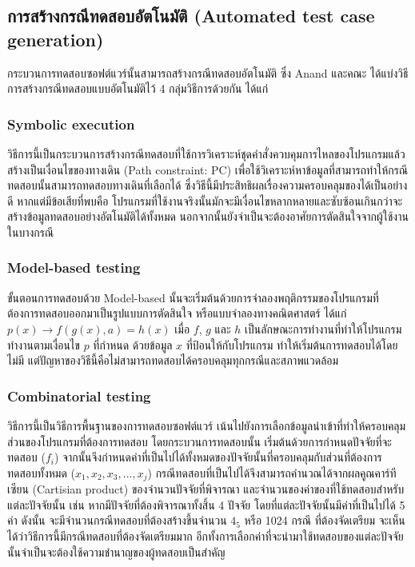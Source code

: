 \subsection{การสร้างกรณีทดสอบอัตโนมัติ (Automated test case generation)}

กระบวนการทดสอบซอฟต์แวร์นั้นสามารถสร้างกรณีทดสอบอัตโนมัติ ซึ่ง Anand และคณะ \cite{Anand2013} ได้แบ่งวิธีการสร้างกรณีทดสอบแบบอัตโนมัติไว้
4 กลุ่มวิธีการด้วยกัน ได้แก่ 

\subsubsection{Symbolic execution}

วิธีการนี้เป็นกระบวนการสร้างกรณีทดสอบที่ใช้การวิเคราะห์ชุดคำสั่งควบคุมการไหลของโปรแกรมแล้วสร้างเป็นเงื่อนไขของทางเดิน (Path constraint: PC) 
เพื่อใช้วิเคราะห์หาข้อมูลที่สามารถทำให้กรณีทดสอบนั้นสามารถทดสอบทางเดินที่เลือกได้ ซึ่งวิธีนี้มีประสิทธิผลเรื่องความครอบคลุมของ{\sourcecode}ได้เป็นอย่างดี
หากแต่มีข้อเสียที่พบคือ โปรแกรมที่ใช้งานจริงนั้นมักจะมีเงื่อนไขหลากหลายและซับซ้อนเกินกว่าจะสร้างข้อมูลทดสอบอย่างอัตโนมัติได้ทั้งหมด 
นอกจากนั้นยังจำเป็นจะต้องอาศัยการตัดสินใจจากผู้ใช้งานในบางกรณี


\subsubsection{Model-based testing}

ขั้นตอนการทดสอบด้วย Model-based นั้นจะเริ่มต้นด้วยการจำลองพฤติกรรมของโปรแกรมที่ต้องการทดสอบออกมาเป็นรูปแบบการตัดสินใจ หรือแบบจำลองทางคณิตศาสตร์
ได้แก่ $p(x) \rightarrow f(g(x), a) = h(x)$ เมื่อ $f$, $g$ และ $h$ เป็นลักษณะการทำงานที่ทำให้โปรแกรมทำงานตามเงื่อนไข $p$ ที่กำหนด 
ด้วยข้อมูล $x$ ที่ป้อนให้กับโปรแกรม ทำให้เริ่มต้นการทดสอบได้โดยไม่มี{\sourcecode} แต่ปัญหาของวิธีนี้คือไม่สามารถทดสอบได้ครอบคลุมทุกกรณีและสภาพแวดล้อม

\subsubsection{Combinatorial testing}

วิธีการนี้เป็นวิธีการพื้นฐานของการทดสอบซอฟต์แวร์ เน้นไปยังการเลือกข้อมูลนำเข้าที่ทำให้ครอบคลุมส่วนของโปรแกรมที่ต้องการทดสอบ โดยกระบวนการทดสอบนั้น
เริ่มต้นด้วยการกำหนดปัจจัยที่จะทดสอบ ($f_i$) จากนั้นจึงกำหนดค่าที่เป็นไปได้ทั้งหมดของปัจจัยนั้นที่ครอบคลุมกับส่วนที่ต้องการทดสอบทั้งหมด 
(${x_1, x_2, x_3, ..., x_j}$) กรณีทดสอบที่เป็นไปได้จึงสามารถคำนวณได้จากผลคูณคาร์ทีเซียน (Cartisian product) ของจำนวนปัจจัยที่พิจารณา 
และจำนวนของค่าของที่ใช้ทดสอบสำหรับแต่ละปัจจัยนั้น เช่น หากมีปัจจัยที่ต้องพิจารณาทั้งสิ้น 4 ปัจจัย โดยที่แต่ละปัจจัยนั้นมีค่าที่เป็นไปได้ 5 ค่า ดังนั้น 
จะมีจำนวนกรณีทดสอบที่ต้องสร้างขึ้นจำนวน $4_5$ หรือ 1024 กรณี ที่ต้องจัดเตรียม จะเห็นได้ว่าวิธีการนี้มีกรณีทดสอบที่ต้องจัดเตรียมมาก 
อีกทั้งการเลือกค่าที่จะนำมาใช้ทดสอบของแต่ละปัจจัยนั้นจำเป็นจะต้องใช้ความชำนาญของผู้ทดสอบเป็นสำคัญ

